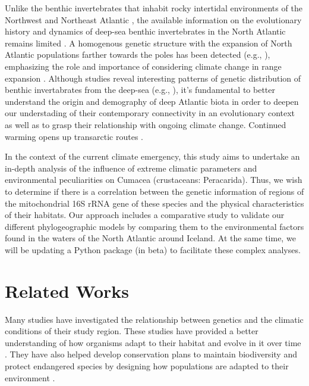Unlike the benthic invertebrates that inhabit rocky intertidal environments of the Northwest and Northeast Atlantic \citep{wares_community_2002, maggs_evaluating_2008, ilves_colonization_2010, jennings_phylogeographic_2014}, the available information on the evolutionary history and dynamics of deep-sea benthic invertebrates in the North Atlantic remains limited \citep{etter_phylogeography_2011, jennings_phylogeographic_2014}. A homogenous genetic structure with the expansion of North Atlantic populations farther towards the poles has been detected (e.g., \citep{aarbakke_discovery_2011}), emphasizing the role and importance of considering climate change in range expansion \citep{jennings_phylogeographic_2014}. Although studies reveal interesting patterns of genetic distribution of benthic invertabrates from the deep-sea (e.g., \citep{wilson_historical_1998, havermans_genetic_2013, jennings_phylogeographic_2014}), it's fundamental to better understand the origin and demography of deep Atlantic biota in order to deepen our understading of their contemporary connectivity in an evolutionary context as well as to grasp their relationship with ongoing climate change. Continued warming opens up transarctic routes \citep{jennings_phylogeographic_2014}.

In the context of the current climate emergency, this study aims to undertake an in-depth analysis of the influence of extreme climatic parameters and environmental peculiarities on Cumacea (crustaceans: Peracarida). Thus, we wish to determine if there is a correlation between the genetic information of regions of the mitochondrial 16S rRNA gene of these species and the physical characteristics of their habitats. Our approach includes a comparative study to validate our different phylogeographic models by comparing them to the environmental factors found in the waters of the North Atlantic around Iceland. At the same time, we will be updating a Python package (in beta) to facilitate these complex analyses.

\section{Related Works}\label{related-works}
Many studies have investigated the relationship between genetics and the climatic conditions of their study region. These studies have provided a better understanding of how organisms adapt to their habitat and evolve in it over time \citep{ghalambor_adaptive_2007, linnen_measuring_2009, schluter_evidence_2009, barrett_molecular_2011, fc_genomic_2012}. They have also helped develop conservation plans to maintain biodiversity and protect endangered species by designing how populations are adapted to their environment \citep{frankham_introduction_2002, reed_correlation_2003, tallmon_alluring_2004, holderegger_brief_2006, balkenhol_identifying_2009}.

